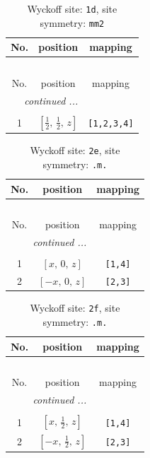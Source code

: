 \documentclass[fleqn,8pt]{jsarticle}
\begin{document}
\renewcommand{\arraystretch}{1.2}
\begin{longtable}{ccc}
\caption{Wyckoff site: {\tt 1d}, site symmetry: {\tt mm2}}
 \\
 \hline \hline
No. & position & mapping \\ \hline \endfirsthead

\multicolumn{2}{l}{\tablename\ \thetable{}} \\
 \hline \hline
No. & position & mapping \\ \hline \endhead

 \hline \hline
\multicolumn{2}{r}{\footnotesize\it continued ...} \\ \endfoot

 \hline \hline
\multicolumn{2}{r}{} \\ \endlastfoot

1 & $\left[ \frac{1}{2},\, \frac{1}{2},\, z \right]$ & {\tt [1,2,3,4]} \\
\end{longtable}
\renewcommand{\arraystretch}{1.2}
\begin{longtable}{ccc}
\caption{Wyckoff site: {\tt 2e}, site symmetry: {\tt .m.}}
 \\
 \hline \hline
No. & position & mapping \\ \hline \endfirsthead

\multicolumn{2}{l}{\tablename\ \thetable{}} \\
 \hline \hline
No. & position & mapping \\ \hline \endhead

 \hline \hline
\multicolumn{2}{r}{\footnotesize\it continued ...} \\ \endfoot

 \hline \hline
\multicolumn{2}{r}{} \\ \endlastfoot

1 & $\left[ x,\, 0,\, z \right]$ & {\tt [1,4]} \\ \hline
2 & $\left[ - x,\, 0,\, z \right]$ & {\tt [2,3]} \\
\end{longtable}
\renewcommand{\arraystretch}{1.2}
\begin{longtable}{ccc}
\caption{Wyckoff site: {\tt 2f}, site symmetry: {\tt .m.}}
 \\
 \hline \hline
No. & position & mapping \\ \hline \endfirsthead

\multicolumn{2}{l}{\tablename\ \thetable{}} \\
 \hline \hline
No. & position & mapping \\ \hline \endhead

 \hline \hline
\multicolumn{2}{r}{\footnotesize\it continued ...} \\ \endfoot

 \hline \hline
\multicolumn{2}{r}{} \\ \endlastfoot

1 & $\left[ x,\, \frac{1}{2},\, z \right]$ & {\tt [1,4]} \\ \hline
2 & $\left[ - x,\, \frac{1}{2},\, z \right]$ & {\tt [2,3]} \\
\end{longtable}
\end{document}

